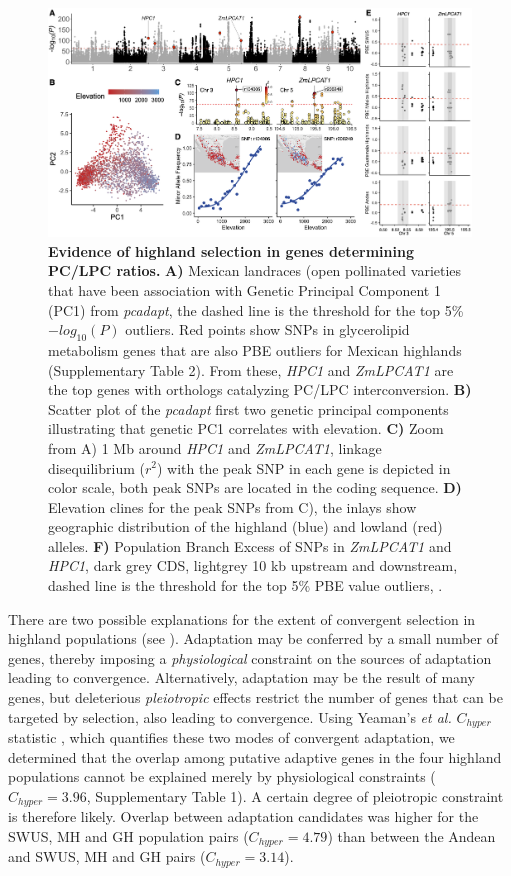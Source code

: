\documentclass[9pt,twocolumn,twoside,lineno]{biorxiv}
\newcommand{\hpc}{\textit{HPC1}\xspace}
\begin{document}
\begin{figure}[ht]
\centering
\includegraphics[width=0.8\paperwidth]{Figures/Fig_2.png}
\caption{\textbf{Evidence of highland selection in genes determining PC/LPC ratios.}
 \textbf{A)} Mexican landraces (open pollinated varieties that have been association with Genetic Principal Component 1 (PC1) from \textit{pcadapt}, the dashed line is the threshold for the top 5\% $-log_{10}(P)$ outliers. 
 Red points show SNPs in glycerolipid metabolism genes that are also PBE outliers for Mexican highlands (Supplementary Table 2). 
 From these, \hpc and \textit{ZmLPCAT1} are the top genes with orthologs catalyzing PC/LPC interconversion. 
 \textbf{B)} Scatter plot of the \textit{pcadapt} first two genetic principal components illustrating that genetic PC1 correlates with elevation.
 \textbf{C)} Zoom from A) 1 Mb around \hpc and \textit{ZmLPCAT1}, linkage disequilibrium ($r^2$) with the peak SNP in each gene is depicted in color scale, both peak SNPs are located in the coding sequence. 
 \textbf{D)} Elevation clines for the peak SNPs from C), the inlays show  geographic distribution of the highland (blue) and lowland (red) alleles.
\textbf{F)} Population Branch Excess of SNPs in \textit{ZmLPCAT1} and \hpc, dark grey CDS, lightgrey 10 kb upstream and downstream, dashed line is the threshold for the top 5\% PBE value outliers, .} 
\label{Fig2}
\end{figure}

There are two possible explanations for the extent of convergent selection in highland populations (see \cite{Wang2020-mp, yeaman2018}). 
Adaptation may be conferred by a small number of genes, thereby imposing a \textit{physiological} constraint on the sources of adaptation leading to convergence. 
Alternatively, adaptation may be the result of many genes, but deleterious \textit{pleiotropic} effects restrict the number of genes that can be targeted by selection, also leading to convergence.  
Using Yeaman's \textit{et al.} $C_{hyper}$ statistic \cite{yeaman2018}, which quantifies these two modes of convergent adaptation, we determined that the overlap among putative adaptive genes in the four highland populations cannot be explained merely by physiological constraints ($C_{hyper} = 3.96$, Supplementary Table 1). 
A certain degree of pleiotropic constraint is therefore likely.
Overlap between adaptation candidates was higher for the SWUS, MH and GH population pairs ($C_{hyper} = 4.79$) than between the Andean and SWUS, MH and GH pairs ($C_{hyper} = 3.14$).
\end{document}
